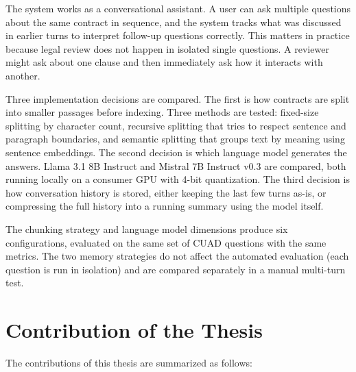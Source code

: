 The system works as a conversational assistant. A user can ask multiple questions about the same contract in sequence, and the system tracks what was discussed in earlier turns to interpret follow-up questions correctly. This matters in practice because legal review does not happen in isolated single questions. A reviewer might ask about one clause and then immediately ask how it interacts with another.

Three implementation decisions are compared. The first is how contracts are split into smaller passages before indexing. Three methods are tested: fixed-size splitting by character count, recursive splitting that tries to respect sentence and paragraph boundaries, and semantic splitting that groups text by meaning using sentence embeddings. The second decision is which language model generates the answers. Llama 3.1 8B Instruct and Mistral 7B Instruct v0.3 are compared, both running locally on a consumer GPU with 4-bit quantization. The third decision is how conversation history is stored, either keeping the last few turns as-is, or compressing the full history into a running summary using the model itself.

The chunking strategy and language model dimensions produce six configurations, evaluated on the same set of CUAD questions with the same metrics. The two memory strategies do not affect the automated evaluation (each question is run in isolation) and are compared separately in a manual multi-turn test.


\section{Contribution of the Thesis}

The contributions of this thesis are summarized as follows:

